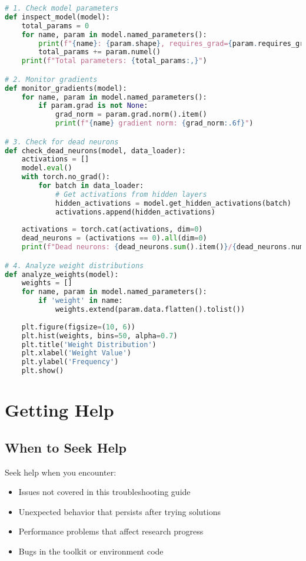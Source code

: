 \begin{lstlisting}[language=python, caption=Model Debugging]
# 1. Check model parameters
def inspect_model(model):
    total_params = 0
    for name, param in model.named_parameters():
        print(f"{name}: {param.shape}, requires_grad={param.requires_grad}")
        total_params += param.numel()
    print(f"Total parameters: {total_params:,}")

# 2. Monitor gradients
def monitor_gradients(model):
    for name, param in model.named_parameters():
        if param.grad is not None:
            grad_norm = param.grad.norm().item()
            print(f"{name} gradient norm: {grad_norm:.6f}")

# 3. Check for dead neurons
def check_dead_neurons(model, data_loader):
    activations = []
    model.eval()
    with torch.no_grad():
        for batch in data_loader:
            # Get activations from hidden layers
            hidden_activations = model.get_hidden_activations(batch)
            activations.append(hidden_activations)
    
    activations = torch.cat(activations, dim=0)
    dead_neurons = (activations == 0).all(dim=0)
    print(f"Dead neurons: {dead_neurons.sum().item()}/{dead_neurons.numel()}")

# 4. Analyze weight distributions
def analyze_weights(model):
    weights = []
    for name, param in model.named_parameters():
        if 'weight' in name:
            weights.extend(param.data.flatten().tolist())
    
    plt.figure(figsize=(10, 6))
    plt.hist(weights, bins=50, alpha=0.7)
    plt.title('Weight Distribution')
    plt.xlabel('Weight Value')
    plt.ylabel('Frequency')
    plt.show()
\end{lstlisting}

\section{Getting Help}

\subsection{When to Seek Help}

Seek help when you encounter:
\begin{itemize}
    \item Issues not covered in this troubleshooting guide
    \item Unexpected behavior that persists after trying solutions
    \item Performance problems that affect research progress
    \item Bugs in the toolkit or environment code
\end{itemize}


